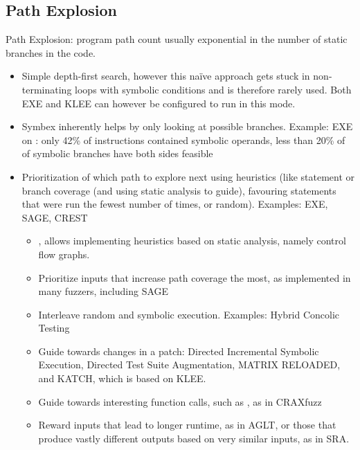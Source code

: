 \documentclass{article}
\begin{document}
\begin{multicols}{2}
    \subsection{Path Explosion}
    Path Explosion: program path count usually exponential in the number of static branches in the code.
    \begin{itemize}
        \item Simple depth-first search, however this naïve approach gets stuck in non-terminating loops with symbolic conditions and is therefore rarely used. Both EXE\cite{EXE} and KLEE\cite{KLEE} can however be configured to run in this mode.
        \item Symbex inherently helps by only looking at possible branches. Example: EXE\cite{EXE} on : only 42\% of instructions contained symbolic operands, less than 20\% of of symbolic branches have both sides feasible\cite{EXE}
        \item Prioritization of which path to explore next using heuristics (like statement or branch coverage (and using static analysis to guide), favouring statements that were run the fewest number of times, or random). Examples: EXE\cite{EXE}, SAGE\cite{SAGE}, CREST\cite{CREST}
              \begin{itemize}
                  \item {}\cite{ReviewThreeDecades}, allows implementing heuristics based on static analysis, namely control flow graphs.
                  \item Prioritize inputs that increase path coverage the most, as implemented in many fuzzers, including SAGE\cite{SAGE}
                  \item Interleave random and symbolic execution. Examples: Hybrid Concolic Testing\cite{HCT, Driller, Cyberdyne}
                  \item Guide towards changes in a patch: Directed Incremental Symbolic Execution\cite{DiSE}, Directed Test Suite Augmentation\cite{DTSA}, MATRIX RELOADED\cite{MATRIXRELOADED}, and KATCH\cite{KATCH}, which is based on KLEE\cite{KLEE}.
                  \item Guide towards interesting function calls, such as , as in CRAXfuzz\cite{CRAXfuzz}
                  \item Reward inputs that lead to longer runtime, as in AGLT\cite{AGLT}, or those that produce vastly different outputs based on very similar inputs, as in SRA\cite{SRA}.

\end{itemize}
\end{itemize}
\end{multicols}
\end{document}
